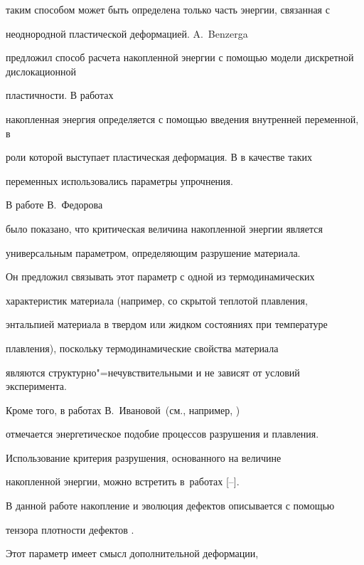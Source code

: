 таким способом может быть определена только часть энергии, связанная с

неоднородной пластической деформацией. A.~Benzerga  \cite{kostina:bib:BenzergaBrechNeedl}

предложил способ расчета накопленной энергии с помощью модели дискретной дислокационной

пластичности. В работах \cite{kostina:bib:StainierOrtiz,kostina:bib:RosakisRaviHodow}

накопленная энергия определяется с помощью введения внутренней переменной, в

роли которой выступает пластическая деформация. В  \cite{kostina:bib:XiaoChen,kostina:bib:DumoulinLouche} в качестве таких

переменных использовались параметры упрочнения.



В работе В.~Федорова~\cite{kostina:bib:Fedorov}

было показано, что критическая величина накопленной энергии является

универсальным параметром, определяющим разрушение материала.

Он предложил связывать этот  параметр с одной из термодинамических

характеристик материала (например, со скрытой теплотой плавления,

энтальпией материала в твердом или жидком состояниях при температуре

плавления), поскольку термодинамические свойства материала

являются структурно"=нечувствительными и не зависят от условий эксперимента.

Кроме того, в работах В.~Ивановой~(см., например, \cite{kostina:bib:Ivanova})

отмечается энергетическое подобие процессов разрушения и плавления.

Использование критерия разрушения, основанного на величине

накопленной энергии, можно встретить в~работах  [--].



В данной работе накопление и эволюция дефектов описывается с помощью

тензора плотности дефектов \cite{kostina:bib:NaimarkP,kostina:bib:PlekNaim}.

Этот параметр имеет смысл дополнительной деформации,

